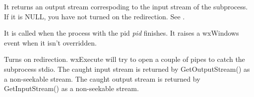\label{wxprocessgetoutputstream}


It returns an output stream correspoding to the input stream of the subprocess.
If it is NULL, you have not turned on the redirection.
See .

\label{wxprocessonterminate}


It is called when the process with the pid {\it pid} finishes.
It raises a wxWindows event when it isn't overridden.



\label{wxprocessredirect}


Turns on redirection. wxExecute will try to open a couple of pipes
to catch the subprocess stdio. The caught input stream is returned by
GetOutputStream() as a non-seekable stream. The caught output stream is returned
by GetInputStream() as a non-seekable stream.

